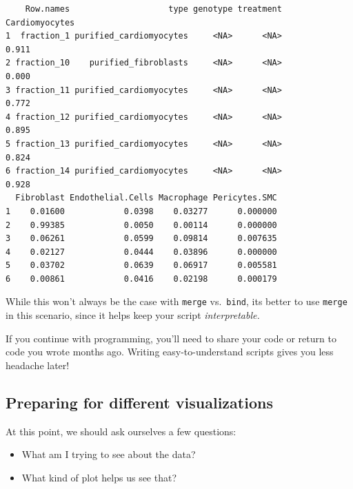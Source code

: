\documentclass[
  letterpaper,
  DIV=11,
  numbers=noendperiod]{scrreprt}
\providecommand{\tightlist}{%
  \setlength{\itemsep}{0pt}\setlength{\parskip}{0pt}}\usepackage{longtable,booktabs,array}
\begin{document}
\begin{verbatim}
    Row.names                    type genotype treatment Cardiomyocytes
1  fraction_1 purified_cardiomyocytes     <NA>      <NA>          0.911
2 fraction_10    purified_fibroblasts     <NA>      <NA>          0.000
3 fraction_11 purified_cardiomyocytes     <NA>      <NA>          0.772
4 fraction_12 purified_cardiomyocytes     <NA>      <NA>          0.895
5 fraction_13 purified_cardiomyocytes     <NA>      <NA>          0.824
6 fraction_14 purified_cardiomyocytes     <NA>      <NA>          0.928
  Fibroblast Endothelial.Cells Macrophage Pericytes.SMC
1    0.01600            0.0398    0.03277      0.000000
2    0.99385            0.0050    0.00114      0.000000
3    0.06261            0.0599    0.09814      0.007635
4    0.02127            0.0444    0.03896      0.000000
5    0.03702            0.0639    0.06917      0.005581
6    0.00861            0.0416    0.02198      0.000179
\end{verbatim}

While this won't always be the case with \texttt{merge}
vs.~\texttt{bind}, its better to use \texttt{merge} in this scenario,
since it helps keep your script \emph{interpretable.}

\begin{tcolorbox}[enhanced jigsaw, bottomtitle=1mm, bottomrule=.15mm, toprule=.15mm, opacityback=0, leftrule=.75mm, breakable, colback=white, toptitle=1mm, left=2mm, coltitle=black, titlerule=0mm, opacitybacktitle=0.6, title=\textcolor{quarto-callout-note-color}{\faInfo}\hspace{0.5em}{Reproducible code}, rightrule=.15mm, arc=.35mm, colframe=quarto-callout-note-color-frame, colbacktitle=quarto-callout-note-color!10!white]

If you continue with programming, you'll need to share your code or
return to code you wrote months ago. Writing easy-to-understand scripts
gives you less headache later!

\end{tcolorbox}

\subsection{Preparing for different
visualizations}\label{preparing-for-different-visualizations}

At this point, we should ask ourselves a few questions:

\begin{itemize}
\tightlist
\item
  What am I trying to see about the data?
\item
  What kind of plot helps us see that?
\end{itemize}
\end{document}

